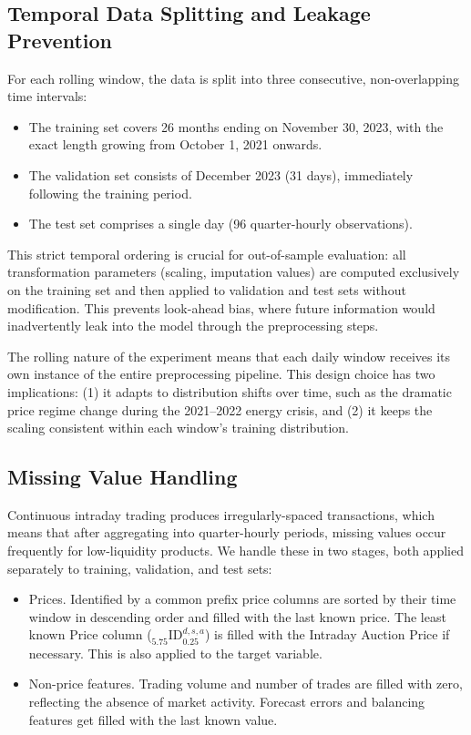 \documentclass[preprint,12pt,nonatbib]{elsarticle}
\begin{document}
\subsection{Temporal Data Splitting and Leakage Prevention}
\label{sub:TemporalSplit}

For each rolling window, the data is split into three consecutive, non-overlapping time intervals:
\begin{itemize}[noitemsep]
    \item The training set covers 26 months ending on November 30, 2023, with the exact length growing from October 1, 2021 onwards.
    \item The validation set consists of December 2023 (31 days), immediately following the training period.
    \item The test set comprises a single day (96 quarter-hourly observations).
\end{itemize}

This strict temporal ordering is crucial for out-of-sample evaluation: all transformation parameters (scaling, imputation values) are computed exclusively on the training set and then applied to validation and test sets without modification.
This prevents look-ahead bias, where future information would inadvertently leak into the model through the preprocessing steps.

The rolling nature of the experiment means that each daily window receives its own instance of the entire preprocessing pipeline.
This design choice has two implications: (1) it adapts to distribution shifts over time, such as the dramatic price regime change during the 2021--2022 energy crisis, and (2) it keeps the scaling consistent within each window's training distribution.

\subsection{Missing Value Handling}
\label{sub:Imputation}

Continuous intraday trading produces irregularly-spaced transactions, which means that after aggregating into quarter-hourly periods, missing values occur frequently for low-liquidity products.
We handle these in two stages, both applied separately to training, validation, and test sets:

\begin{itemize}[noitemsep]
    \item Prices. Identified by a common prefix price columns are sorted by their time window in descending order and filled with the last known price. 
    The least known Price column (\({}_{5.75}^{\;}\!\text{ID}_{0.25}^{d,s,a}\)) is filled with the Intraday Auction Price if necessary.
    This is also applied to the target variable.
    \item Non-price features. Trading volume and number of trades are filled with zero, reflecting the absence of market activity. Forecast errors and balancing features get filled with the last known value.
\end{itemize}
\end{document}
